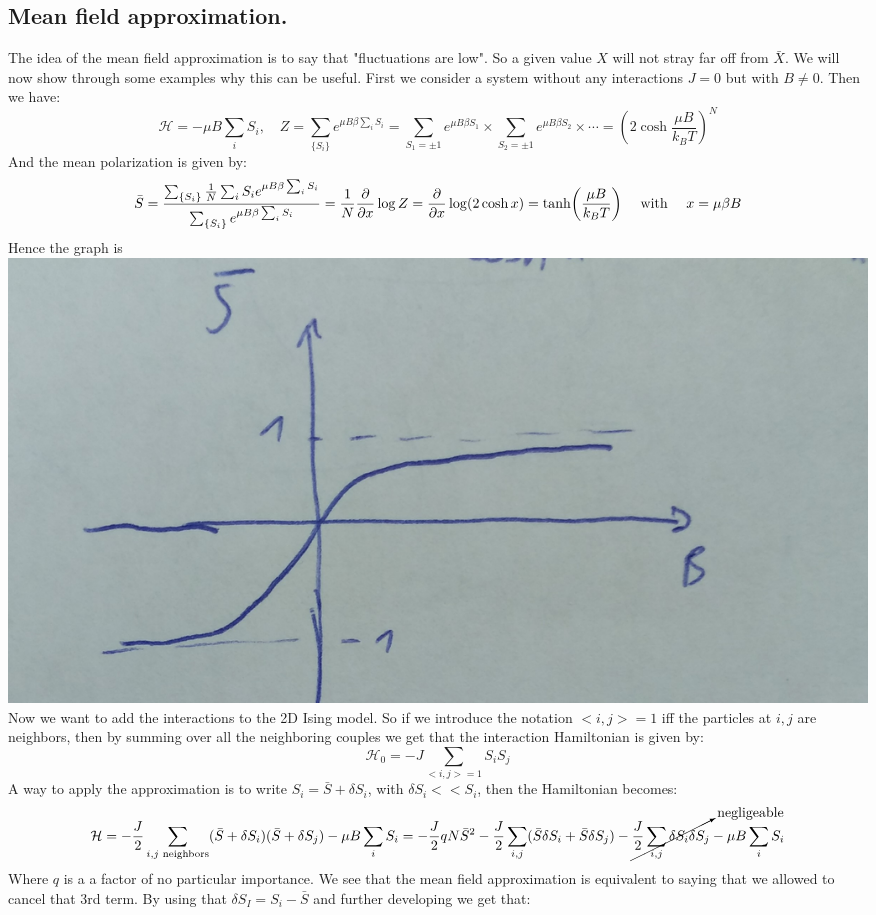 \documentclass[10pt,a4paper]{book}
\begin{document}
\subsection{Mean field approximation.}
The idea of the mean field approximation is to say that "fluctuations are low". So a given value $X$ will not stray far off from $\bar{X}$. We will now show through some examples why this can be useful. First we consider a system without any interactions $J = 0$ but with $B \neq 0$. Then we have:
\[
\mathcal{H} = -\mu B \sum_i S_i, \quad Z = \sum_{\{S_i\}} e^{\mu B \beta \sum_i S_i} = \sum_{S_1 = \pm 1} e^{\mu B \beta S_1} \times \sum_{S_2 = \pm 1} e^{\mu B \beta S_2} \times \cdots = \left(2 \cosh \frac{\mu B}{k_B T}\right)^N
\]
And the mean polarization is given by:
\[
\bar{S} = \frac{\sum_{\{S_i\}} \frac{1}{N} \sum_i S_i e^{\mu B \beta \sum_i S_i}}{\sum_{\{S_i\}} e^{\mu B \beta \sum_i S_i}} =  \frac{1}{N} \pdv{}{x} \log Z = \pdv{}{x} \log(2 \cosh x) = \tanh(\frac{\mu B}{k_B T}) \quad \text{ with } \quad x = \mu \beta B
\]
Hence the graph is \\
\includegraphics[scale=0.1]{graphs/tanh}\\
Now we want to add the interactions to the 2D Ising model. So if we introduce the notation $<i,j>=1$ iff the particles at $i,j$ are neighbors, then by summing over all the neighboring couples we get that the interaction Hamiltonian is given by:
\[
\mathcal{H}_0 = - J \sum_{<i,j> = 1} S_i S_j
\]
A way to apply the approximation is to write $S_i = \bar S + \delta S_i$, with $\delta S_i<<S_i$, then the Hamiltonian becomes:
\[
\mathcal{H} = - \frac{J}{2} \sum_{i,j\text{ neighbors}} (\bar{S} + \delta S_i)(\bar{S} + \delta S_j) - \mu B \sum_i S_i = -\frac{J}{2}qN \bar{S}^2 - \frac{J}{2}\sum_{i,j}(\bar{S}  \delta S_i + \bar{S} \delta S_j) - \cancelto{\text{negligeable}}{\frac{J}{2}\sum_{i,j} \delta S_i \delta S_j} - \mu B \sum_i S_i
\]
Where $q$ is a a factor of no particular importance. We see that the mean field approximation is equivalent to saying that we allowed to cancel that 3rd term. By using that $\delta S_I=S_i-\bar{S}$ and further developing we get that:
\end{document}
